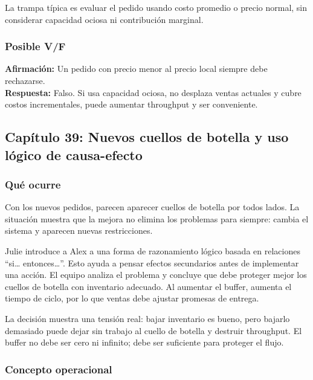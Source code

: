 \documentclass[
  11pt,
]{article}
\begin{document}
La trampa típica es evaluar el pedido usando costo promedio o precio
normal, sin considerar capacidad ociosa ni contribución marginal.

\hypertarget{posible-vf-11}{%
\subsubsection{Posible V/F}\label{posible-vf-11}}

\textbf{Afirmación:} Un pedido con precio menor al precio local siempre
debe rechazarse.\\
\textbf{Respuesta:} Falso. Si usa capacidad ociosa, no desplaza ventas
actuales y cubre costos incrementales, puede aumentar throughput y ser
conveniente.

\hypertarget{capuxedtulo-39-nuevos-cuellos-de-botella-y-uso-luxf3gico-de-causa-efecto}{%
\subsection{Capítulo 39: Nuevos cuellos de botella y uso lógico de
causa-efecto}\label{capuxedtulo-39-nuevos-cuellos-de-botella-y-uso-luxf3gico-de-causa-efecto}}

\hypertarget{quuxe9-ocurre-12}{%
\subsubsection{Qué ocurre}\label{quuxe9-ocurre-12}}

Con los nuevos pedidos, parecen aparecer cuellos de botella por todos
lados. La situación muestra que la mejora no elimina los problemas para
siempre: cambia el sistema y aparecen nuevas restricciones.

Julie introduce a Alex a una forma de razonamiento lógico basada en
relaciones ``si\ldots{} entonces\ldots{}''. Esto ayuda a pensar efectos
secundarios antes de implementar una acción. El equipo analiza el
problema y concluye que debe proteger mejor los cuellos de botella con
inventario adecuado. Al aumentar el buffer, aumenta el tiempo de ciclo,
por lo que ventas debe ajustar promesas de entrega.

La decisión muestra una tensión real: bajar inventario es bueno, pero
bajarlo demasiado puede dejar sin trabajo al cuello de botella y
destruir throughput. El buffer no debe ser cero ni infinito; debe ser
suficiente para proteger el flujo.

\hypertarget{concepto-operacional-12}{%
\subsubsection{Concepto operacional}\label{concepto-operacional-12}}
\end{document}
